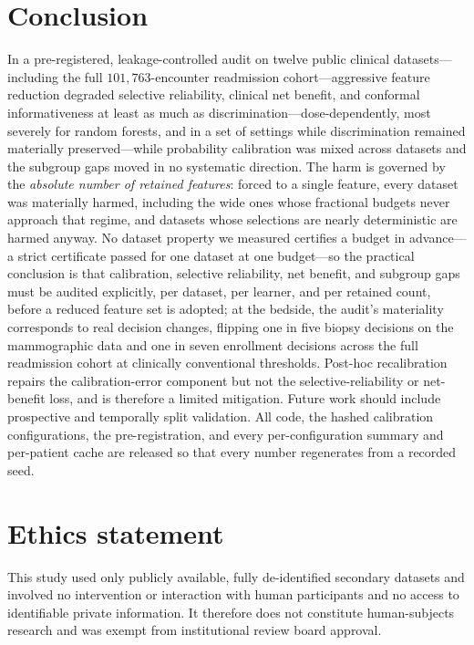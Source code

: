 \documentclass[fleqn,10pt]{wlscirep}
\begin{document}
\section{Conclusion}
\label{sec:conclusion}

In a pre-registered, leakage-controlled audit on twelve public clinical datasets---including the full
$101{,}763$-encounter readmission cohort---aggressive feature reduction degraded selective
reliability, clinical net benefit, and conformal informativeness at least as much as
discrimination---dose-dependently, most severely for random forests, and in a set of settings while
discrimination remained materially preserved---while probability calibration was mixed across datasets
and the subgroup gaps moved in no systematic direction. The harm is governed by the \emph{absolute
number of retained features}: forced to a single feature, every dataset was materially harmed,
including the wide ones whose fractional budgets never approach that regime, and datasets whose
selections are nearly deterministic are harmed anyway. No dataset property we measured certifies a budget in
advance---a strict certificate passed for one dataset at one budget---so the practical conclusion is
that calibration, selective reliability, net benefit, and subgroup gaps must be audited explicitly,
per dataset, per learner, and per retained count, before a reduced feature set is adopted; at the
bedside, the audit's materiality corresponds to real decision changes, flipping one in five biopsy
decisions on the mammographic data and one in seven enrollment decisions across the full readmission
cohort at clinically conventional thresholds. Post-hoc recalibration repairs the calibration-error
component but not the selective-reliability or net-benefit loss, and is therefore a limited
mitigation. Future work should include prospective and temporally split validation. All code, the
hashed calibration configurations, the pre-registration, and every per-configuration summary and
per-patient cache are released so that every number regenerates from a recorded seed.

\section*{Ethics statement}
This study used only publicly available, fully de-identified secondary datasets and involved no
intervention or interaction with human participants and no access to identifiable private
information. It therefore does not constitute human-subjects research and was exempt from
institutional review board approval.
\end{document}
